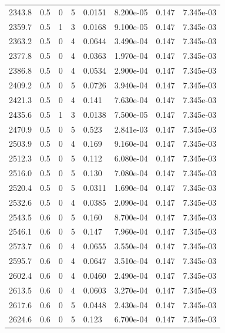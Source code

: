 \documentclass[preview]{standalone}
\begin{document}
{{{{{{{\begin{tabular}{L{1.2cm}C{1.2cm} C{0.3cm}C{0.5cm} C{1.4cm}C{1.4cm} C{1.4cm}C{1.4cm}}
  2343.8  &   0.5  & 0     &  5 &  0.0151  & 8.200e-05  & 0.147 &  7.345e-03   \\ 
  2359.7  &   0.5  & 1     &  3 &  0.0168  & 9.100e-05  & 0.147 &  7.345e-03   \\ 
  2363.2  &   0.5  & 0     &  4 &  0.0644  & 3.490e-04  & 0.147 &  7.345e-03   \\ 
  2377.8  &   0.5  & 0     &  4 &  0.0363  & 1.970e-04  & 0.147 &  7.345e-03   \\ 
  2386.8  &   0.5  & 0     &  4 &  0.0534  & 2.900e-04  & 0.147 &  7.345e-03   \\ 
  2409.2  &   0.5  & 0     &  5 &  0.0726  & 3.940e-04  & 0.147 &  7.345e-03   \\ 
  2421.3  &   0.5  & 0     &  4 &  0.141  & 7.630e-04  & 0.147 &  7.345e-03   \\ 
  2435.6  &   0.5  & 1     &  3 &  0.0138  & 7.500e-05  & 0.147 &  7.345e-03   \\ 
  2470.9  &   0.5  & 0     &  5 &  0.523  & 2.841e-03  & 0.147 &  7.345e-03   \\ 
  2503.9  &   0.5  & 0     &  4 &  0.169  & 9.160e-04  & 0.147 &  7.345e-03   \\ 
  2512.3  &   0.5  & 0     &  5 &  0.112  & 6.080e-04  & 0.147 &  7.345e-03   \\ 
  2516.0  &   0.5  & 0     &  5 &  0.130  & 7.080e-04  & 0.147 &  7.345e-03   \\ 
  2520.4  &   0.5  & 0     &  5 &  0.0311  & 1.690e-04  & 0.147 &  7.345e-03   \\ 
  2532.6  &   0.5  & 0     &  4 &  0.0385  & 2.090e-04  & 0.147 &  7.345e-03   \\ 
  2543.5  &   0.6  & 0     &  5 &  0.160  & 8.700e-04  & 0.147 &  7.345e-03   \\ 
  2546.1  &   0.6  & 0     &  5 &  0.147  & 7.960e-04  & 0.147 &  7.345e-03   \\ 
  2573.7  &   0.6  & 0     &  4 &  0.0655  & 3.550e-04  & 0.147 &  7.345e-03   \\ 
  2595.7  &   0.6  & 0     &  4 &  0.0647  & 3.510e-04  & 0.147 &  7.345e-03   \\ 
  2602.4  &   0.6  & 0     &  4 &  0.0460  & 2.490e-04  & 0.147 &  7.345e-03   \\ 
  2613.5  &   0.6  & 0     &  4 &  0.0603  & 3.270e-04  & 0.147 &  7.345e-03   \\ 
  2617.6  &   0.6  & 0     &  5 &  0.0448  & 2.430e-04  & 0.147 &  7.345e-03   \\ 
  2624.6  &   0.6  & 0     &  5 &  0.123  & 6.700e-04  & 0.147 &  7.345e-03   \\ 

\end{tabular}}}}}}}}
\end{document}
